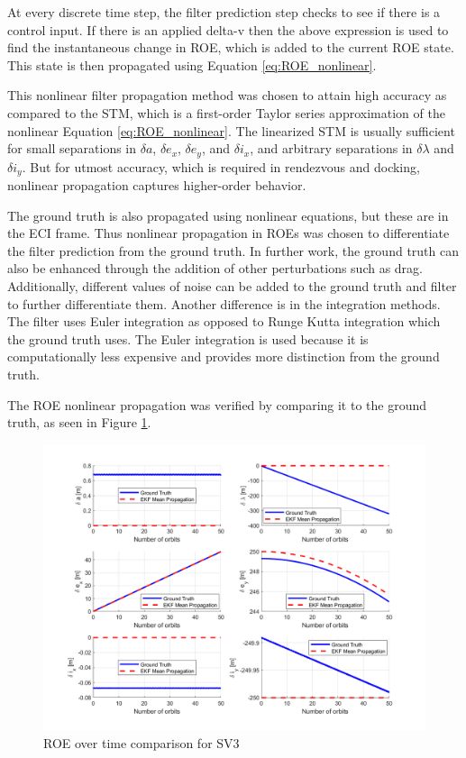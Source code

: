 At every discrete time step, the filter prediction step checks to see if there is a control input. If there is an applied delta-v then the above expression is used to find the instantaneous change in ROE, which is added to the current ROE state. This state is then propagated using Equation \ref{eq:ROE_nonlinear}. 

This nonlinear filter propagation method was chosen to attain high accuracy as compared to the STM, which is a first-order Taylor series approximation of the nonlinear Equation \ref{eq:ROE_nonlinear}. The linearized STM is usually sufficient for small separations in $\delta a$, $\delta e_x$, $\delta e_y$, and $\delta i_x$, and arbitrary separations in $\delta \lambda$ and $\delta i_y$. \cite{koenig2017new} But for utmost accuracy, which is required in rendezvous and docking, nonlinear propagation captures higher-order behavior. 

The ground truth is also propagated using nonlinear equations, but these are in the ECI frame. Thus nonlinear propagation in ROEs was chosen to differentiate the filter prediction from the ground truth. In further work, the ground truth can also be enhanced through the addition of other perturbations such as drag. Additionally, different values of noise can be added to the ground truth and filter to further differentiate them. Another difference is in the integration methods. The filter uses Euler integration as opposed to Runge Kutta integration which the ground truth uses. The Euler integration is used because it is computationally less expensive and provides more distinction from the ground truth. 

The ROE nonlinear propagation was verified by comparing it to the ground truth, as seen in Figure \ref{fig:ROE_nonlinear_compare}. 

\begin{figure}[H]
    \centering
    \includegraphics[width=0.75\linewidth]{sim/figures/PS7/ROE_over_time_SV3_comparison.png}
    \caption{ROE over time comparison for SV3}
    \label{fig:ROE_nonlinear_compare}
\end{figure}

